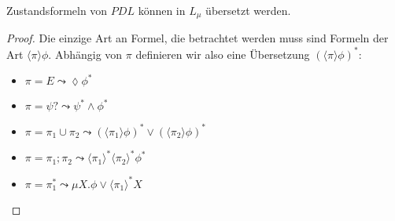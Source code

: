 \begin{satz}
	Zustandsformeln von $PDL$ können in $L_\mu$ übersetzt werden.
\end{satz}
\begin{proof}
	Die einzige Art an Formel, die betrachtet werden muss sind Formeln der Art $\langle \pi \rangle \phi$. Abhängig von $\pi$ definieren wir also eine Übersetzung $(\langle\pi\rangle \phi)^\ast$:
	\begin{itemize}
		\item $\pi = E \leadsto \lozenge\phi^\ast$
		\item $\pi=\psi? \leadsto \psi^\ast \land \phi^\ast$
		\item $\pi = \pi_1\cup\pi_2 \leadsto (\langle\pi_1\rangle\phi)^\ast \lor(\langle\pi_2\rangle\phi)^\ast$
		\item $\pi=\pi_1;\pi_2 \leadsto \langle\pi_1\rangle^\ast \langle\pi_2\rangle^\ast \phi^\ast$
		\item $\pi=\pi_1^\ast \leadsto \mu X .\phi\lor \langle\pi_1\rangle^\ast X$
	\end{itemize}
\end{proof}












